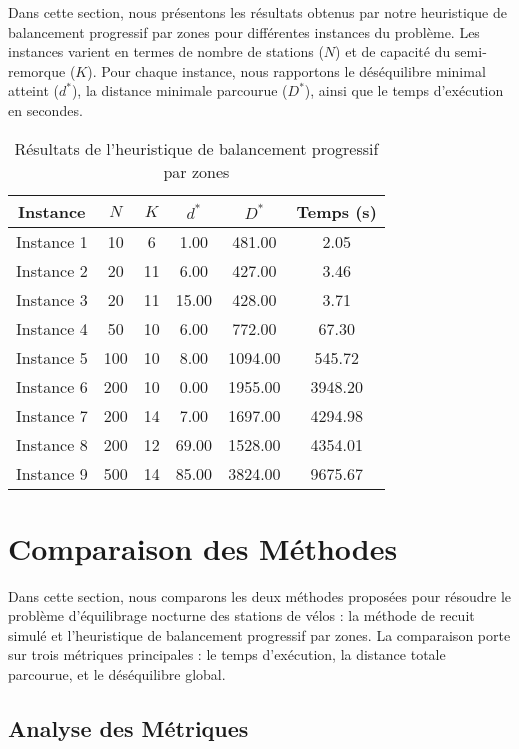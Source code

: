 \documentclass{article}
\begin{document}
Dans cette section, nous présentons les résultats obtenus par notre heuristique de balancement progressif par zones pour différentes instances du problème. Les instances varient en termes de nombre de stations ($N$) et de capacité du semi-remorque ($K$). Pour chaque instance, nous rapportons le déséquilibre minimal atteint ($d^*$), la distance minimale parcourue ($D^*$), ainsi que le temps d'exécution en secondes.
\begin{table}[!h]
    \centering
    \begin{tabular}{|c|c|c|c|c|c|}
        \hline
        Instance & $N$ & $K$ & $d^*$ & $D^*$ & Temps (s) \\
        \hline
        Instance 1 & 10 & 6 & 1.00 & 481.00 & 2.05 \\
        Instance 2 & 20 & 11 & 6.00 & 427.00 & 3.46 \\
        Instance 3 & 20 & 11 & 15.00 & 428.00 & 3.71 \\
        Instance 4 & 50 & 10 & 6.00 & 772.00 & 67.30 \\
        Instance 5 & 100 & 10 & 8.00 & 1094.00 & 545.72 \\
        Instance 6 & 200 & 10 & 0.00 & 1955.00 & 3948.20 \\
        Instance 7 & 200 & 14 & 7.00 & 1697.00 & 4294.98 \\
        Instance 8 & 200 & 12 & 69.00 & 1528.00 & 4354.01 \\
        Instance 9 & 500 & 14 & 85.00 & 3824.00 & 9675.67 \\
        \hline
    \end{tabular}
    \caption{Résultats de l'heuristique de balancement progressif par zones}
\end{table}
       \section{Comparaison des Méthodes}
       
       Dans cette section, nous comparons les deux méthodes proposées pour résoudre le problème d'équilibrage nocturne des stations de vélos : la méthode de recuit simulé et l'heuristique de balancement progressif par zones. La comparaison porte sur trois métriques principales : le temps d'exécution, la distance totale parcourue, et le déséquilibre global.
       
       \subsection{Analyse des Métriques}
       
\end{document}

